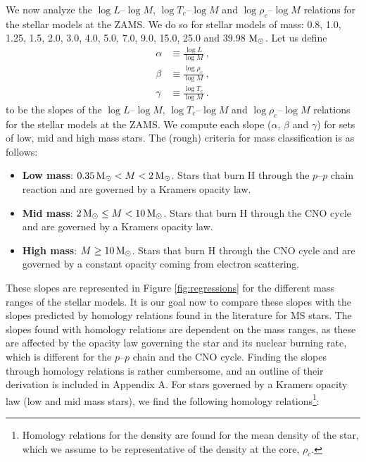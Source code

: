 We now analyze the $\log L \text{--} \log M$, $\log T_c \text{--} \log M$ and $\log \rho_c \text{--} \log M$ relations for the stellar models at the ZAMS. We do so for stellar models of mass: 0.8, 1.0, 1.25, 1.5, 2.0, 3.0, 4.0, 5.0, 7.0, 9.0, 15.0, 25.0 and 39.98 ${\rm M}_\odot$. Let us define
\begin{align}
    \alpha & \equiv \frac{\log L}{\log M} \ , \label{eq:alpha}      \\
    \beta  & \equiv \frac{\log \rho_c}{\log M} \ ,  \label{eq:beta} \\
    \gamma & \equiv \frac{\log T_c}{\log M} \ . \label{eq:gamma}
\end{align}
to be the slopes of the $\log L \text{--} \log M$, $\log T_c \text{--} \log M$ and $\log \rho_c \text{--} \log M$ relations for the stellar models at the ZAMS. We compute each slope ($\alpha$, $\beta$ and $\gamma$) for sets of low, mid and high mass stars. The (rough) criteria for mass classification is as follows:
\begin{itemize}
    \item \textbf{Low mass}: $0.35 \, {\rm M}_\odot < M < 2 \, {\rm M}_\odot$. Stars that burn H through the $p\text{--}p$ chain reaction and are governed by a Kramers opacity law.
    \item \textbf{Mid mass}: $ 2 \, {\rm M}_\odot \leq M < 10 \, {\rm M}_\odot$. Stars that burn H through the CNO cycle and are governed by a Kramers opacity law.
    \item \textbf{High mass}: $M \geq 10 \, {\rm M}_\odot$. Stars that burn H through the CNO cycle and are governed by a constant opacity coming from electron scattering.
\end{itemize}
These slopes are represented in Figure \ref{fig:regressions} for the different mass ranges of the stellar models. It is our goal now to compare these slopes with the slopes predicted by homology relations found in the literature for MS stars. The slopes found with homology relations are dependent on the mass ranges, as these are affected by the opacity law governing the star and its nuclear burning rate, which is different for the $p\text{--}p$ chain and the CNO cycle. Finding the slopes through homology relations is rather cumbersome, and an outline of their derivation is included in Appendix A. For stars governed by a Kramers opacity law  (low and mid mass stars), we find the following homology relations\footnote{Homology relations for the density are found for the mean density of the star, which we assume to be representative of the density at the core, $\rho_c$.}:
